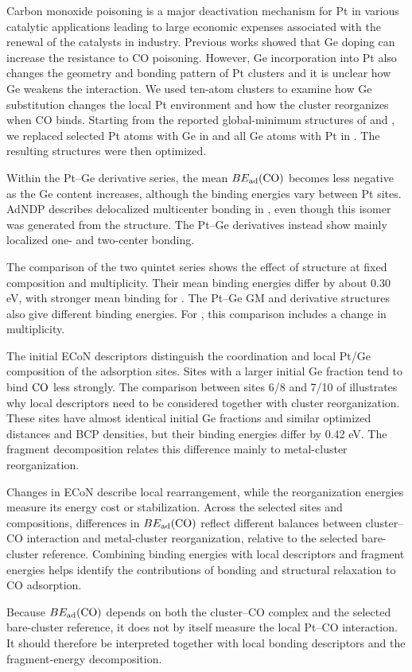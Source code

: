 Carbon monoxide poisoning is a major deactivation mechanism for Pt in various catalytic applications leading to large economic expenses associated with the renewal of the catalysts in industry. Previous works showed that Ge doping can increase the resistance to CO poisoning. However, Ge incorporation into Pt also changes the geometry and bonding pattern of Pt clusters and it is unclear how Ge weakens the  interaction. 
We used ten-atom clusters to examine how Ge substitution changes the
local Pt environment and how the cluster reorganizes when CO binds.
Starting from the reported global-minimum structures of  and , we replaced selected Pt atoms with Ge in  and all Ge atoms with Pt in . The resulting structures were then optimized.

Within the Pt--Ge derivative series, the mean $BE_{\rm ad}(\ce{CO})$ becomes less negative as the Ge content increases, although the binding energies vary between Pt sites. AdNDP describes delocalized multicenter bonding in , even though this isomer was generated from the  structure. The Pt--Ge derivatives instead show mainly localized one- and two-center bonding.

The comparison of the two  quintet series shows the effect of
structure at fixed composition and multiplicity. Their mean binding energies
differ by about 0.30 eV, with stronger mean binding for .
The Pt--Ge GM and derivative structures also give different  binding
energies. For , this comparison includes a change in multiplicity.

The initial ECoN descriptors distinguish the coordination and local Pt/Ge composition of 
the adsorption sites. Sites with a larger initial Ge fraction tend to bind \(\ce{CO}\) less strongly.
The comparison between sites 6/8 and 7/10 of  illustrates
why local descriptors need to be considered together with cluster
reorganization. These sites have almost identical initial Ge fractions and
similar optimized  distances and BCP densities, but their binding
energies differ by 0.42 eV. The fragment decomposition relates this difference
mainly to metal-cluster reorganization.

Changes in ECoN describe local rearrangement, while the reorganization energies measure its energy cost or stabilization. 
Across the selected sites and compositions, differences in
$BE_{\rm ad}(\ce{CO})$ reflect different balances between cluster--CO
interaction and metal-cluster reorganization, relative to the selected
bare-cluster reference. Combining binding energies with local descriptors
and fragment energies helps identify the contributions of bonding and
structural relaxation to CO adsorption.

Because $BE_{\rm ad}(\ce{CO})$ depends on both the cluster--CO complex and the
selected bare-cluster reference, it does not by itself measure the local
Pt--CO interaction. It should therefore be interpreted together with local
bonding descriptors and the fragment-energy decomposition.

